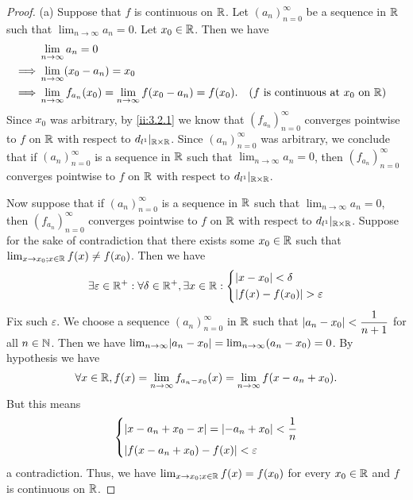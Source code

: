 \begin{proof}{(a)}
  Suppose that \(f\) is continuous on \(\mathbb{R}\).
  Let \((a_n)_{n = 0}^\infty\) be a sequence in \(\mathbb{R}\) such that \(\lim_{n \to \infty} a_n = 0\).
  Let \(x_0 \in \mathbb{R}\).
  Then we have
  \begin{align*}
             & \lim_{n \to \infty} a_n = 0                                                                                                          \\
    \implies & \lim_{n \to \infty} (x_0 - a_n) = x_0                                                                                                \\
    \implies & \lim_{n \to \infty} f_{a_n}(x_0) = \lim_{n \to \infty} f(x_0 - a_n) = f(x_0). &  & \text{(\(f\) is continuous at \(x_0\) on \(\mathbb{R}\))}
  \end{align*}
  Since \(x_0\) was arbitrary, by \cref{ii:3.2.1} we know that \((f_{a_n})_{n = 0}^\infty\) converges pointwise to \(f\) on \(\mathbb{R}\) with respect to \(d_{l^1}|_{\mathbb{R} \times \mathbb{R}}\).
  Since \((a_n)_{n = 0}^\infty\) was arbitrary, we conclude that if \((a_n)_{n = 0}^\infty\) is a sequence in \(\mathbb{R}\) such that \(\lim_{n \to \infty} a_n = 0\), then \((f_{a_n})_{n = 0}^\infty\) converges pointwise to \(f\) on \(\mathbb{R}\) with respect to \(d_{l^1}|_{\mathbb{R} \times \mathbb{R}}\).

  Now suppose that if \((a_n)_{n = 0}^\infty\) is a sequence in \(\mathbb{R}\) such that \(\lim_{n \to \infty} a_n = 0\), then \((f_{a_n})_{n = 0}^\infty\) converges pointwise to \(f\) on \(\mathbb{R}\) with respect to \(d_{l^1}|_{\mathbb{R} \times \mathbb{R}}\).
  Suppose for the sake of contradiction that there exists some \(x_0 \in \mathbb{R}\) such that \(\lim_{x \to x_0 ; x \in \mathbb{R}} f(x) \neq f(x_0)\).
  Then we have
  \[
    \exists \varepsilon \in \mathbb{R}^+ : \forall \delta \in \mathbb{R}^+, \exists x \in \mathbb{R} : \begin{dcases}
      \left\lvert x - x_0\right\rvert < \delta \\
      \left\lvert f(x) - f(x_0)\right\rvert > \varepsilon
    \end{dcases}
  \]
  Fix such \(\varepsilon\).
  We choose a sequence \((a_n)_{n = 0}^\infty\) in \(\mathbb{R}\) such that \(\left\lvert a_n - x_0\right\rvert < \dfrac{1}{n + 1}\) for all \(n \in \mathbb{N}\).
  Then we have \(\lim_{n \to \infty} \abs{a_n - x_0} = \lim_{n \to \infty} (a_n - x_0) = 0\).
  By hypothesis we have
  \[
    \forall x \in \mathbb{R}, f(x) = \lim_{n \to \infty} f_{a_n - x_0}(x) = \lim_{n \to \infty} f(x - a_n + x_0).
  \]
  But this means
  \[
    \begin{dcases}
      \left\lvert x - a_n + x_0 - x\right\rvert = \left\lvert-a_n + x_0\right\rvert < \dfrac{1}{n} \\
      \left\lvert f(x - a_n + x_0) - f(x)\right\rvert < \varepsilon
    \end{dcases}
  \]
  a contradiction.
  Thus, we have \(\lim_{x \to x_0 ; x \in \mathbb{R}} f(x) = f(x_0)\) for every \(x_0 \in \mathbb{R}\) and \(f\) is continuous on \(\mathbb{R}\).
\end{proof}

